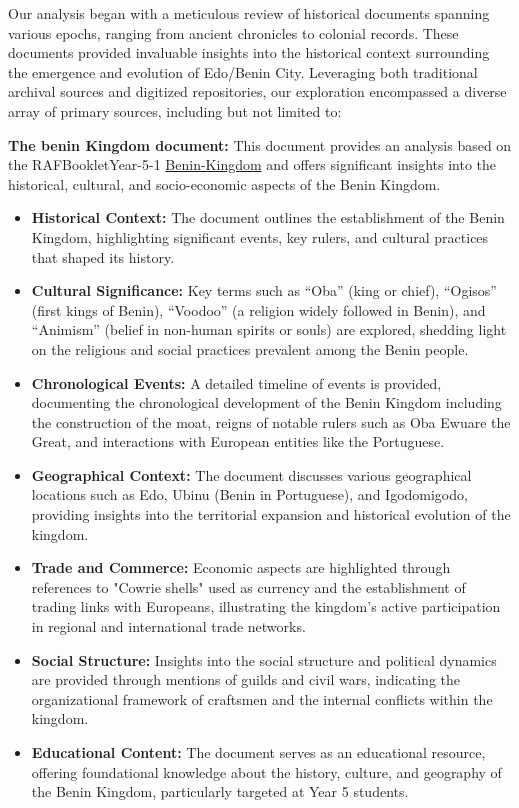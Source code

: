 Our analysis began with a meticulous review of historical documents spanning various epochs, ranging from ancient chronicles to colonial records. These documents provided invaluable insights into the historical context surrounding the emergence and evolution of Edo/Benin City. Leveraging both traditional archival sources and digitized repositories, our exploration encompassed a diverse array of primary sources, including but not limited to:

\textbf{The benin Kingdom document:}
This document provides an analysis based on the RAFBookletYear-5-1 \href{https://denhamgreenacademy.e-act.org.uk/wp-content/uploads/sites/5/2020/10/RAFBookletYear-5-1Benin-Kingdom-paper-size-297x21-cmUPDATED.210187322-wecompress.com_.pdf}{Benin-Kingdom} and offers significant insights into the historical, cultural, and socio-economic aspects of the Benin Kingdom.

\begin{itemize}
  \item \textbf{Historical Context:} The document outlines the establishment of the Benin Kingdom, highlighting significant events, key rulers, and cultural practices that shaped its history.
  \item \textbf{Cultural Significance:} Key terms such as ``Oba'' (king or chief), ``Ogisos'' (first kings of Benin), ``Voodoo'' (a religion widely followed in Benin), and ``Animism'' (belief in non-human spirits or souls) are explored, shedding light on the religious and social practices prevalent among the Benin people.
  \item \textbf{Chronological Events:} A detailed timeline of events is provided, documenting the chronological development of the Benin Kingdom including the construction of the moat, reigns of notable rulers such as Oba Ewuare the Great, and interactions with European entities like the Portuguese.
  \item \textbf{Geographical Context:} The document discusses various geographical locations such as Edo, Ubinu (Benin in Portuguese), and Igodomigodo, providing insights into the territorial expansion and historical evolution of the kingdom.
  \item \textbf{Trade and Commerce:} Economic aspects are highlighted through references to "Cowrie shells" used as currency and the establishment of trading links with Europeans, illustrating the kingdom's active participation in regional and international trade networks.
  \item \textbf{Social Structure:} Insights into the social structure and political dynamics are provided through mentions of guilds and civil wars, indicating the organizational framework of craftsmen and the internal conflicts within the kingdom.
  \item \textbf{Educational Content:} The document serves as an educational resource, offering foundational knowledge about the history, culture, and geography of the Benin Kingdom, particularly targeted at Year 5 students.
\end{itemize}
